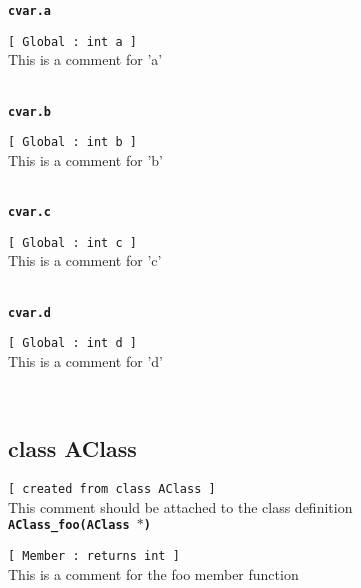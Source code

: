 {\tt \bf cvar.a }
\\
\makebox[0.5in]{}\begin{minipage}[t]{6in}
{\tt [ Global : int  a ]  }\\
   This is a comment for 'a'   
\\

\end{minipage}\\

{\tt \bf cvar.b }
\\
\makebox[0.5in]{}\begin{minipage}[t]{6in}
{\tt [ Global : int  b ]  }\\
   This is a comment for 'b'   
\\

\end{minipage}\\

{\tt \bf cvar.c }
\\
\makebox[0.5in]{}\begin{minipage}[t]{6in}
{\tt [ Global : int  c ]  }\\
   This is a comment for 'c'   
\\

\end{minipage}\\

{\tt \bf cvar.d }
\\
\makebox[0.5in]{}\begin{minipage}[t]{6in}
{\tt [ Global : int  d ]  }\\
   This is a comment for 'd'   
\\

\end{minipage}\\

\subsection{class AClass}{\tt [ created from class AClass ]  }\\
   This comment should be attached to the class definition   
\\{\tt \bf AClass\_foo(AClass $*$) }
\\
\makebox[0.5in]{}\begin{minipage}[t]{6in}
{\tt [ Member : returns int  ]  }\\
   This is a comment for the foo member function   
\\

\end{minipage}\\


